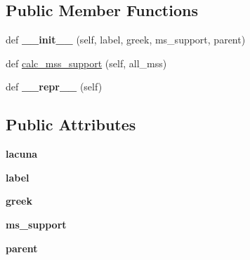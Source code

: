\subsection*{Public Member Functions}
\begin{DoxyCompactItemize}
\item 
\mbox{\label{classCBGM_1_1populate__db_1_1Reading_af4b405e7576f61acb0553afcd2b6a85d}} 
def {\bfseries \+\_\+\+\_\+init\+\_\+\+\_\+} (self, label, greek, ms\+\_\+support, parent)
\item 
def \hyperlink{classCBGM_1_1populate__db_1_1Reading_a3bf5a41e1c3e75a3e68ccd875abaec14}{calc\+\_\+mss\+\_\+support} (self, all\+\_\+mss)
\item 
\mbox{\label{classCBGM_1_1populate__db_1_1Reading_aa0541611a5e63b28be511424c00bf09a}} 
def {\bfseries \+\_\+\+\_\+repr\+\_\+\+\_\+} (self)
\end{DoxyCompactItemize}
\subsection*{Public Attributes}
\begin{DoxyCompactItemize}
\item 
\mbox{\label{classCBGM_1_1populate__db_1_1Reading_ad238a8f5526e3cefdd784db1832d33d6}} 
{\bfseries lacuna}
\item 
\mbox{\label{classCBGM_1_1populate__db_1_1Reading_ae8ed3c81e4b05935e656205b03be2cfe}} 
{\bfseries label}
\item 
\mbox{\label{classCBGM_1_1populate__db_1_1Reading_a90156e434a18bf29c2566d2280eb4ddc}} 
{\bfseries greek}
\item 
\mbox{\label{classCBGM_1_1populate__db_1_1Reading_aa158d27362f00f933ea97fbcdc740a8e}} 
{\bfseries ms\+\_\+support}
\item 
\mbox{\label{classCBGM_1_1populate__db_1_1Reading_a27731d61c8271ae959a5c1b978b6fc22}} 
{\bfseries parent}
\end{DoxyCompactItemize}


